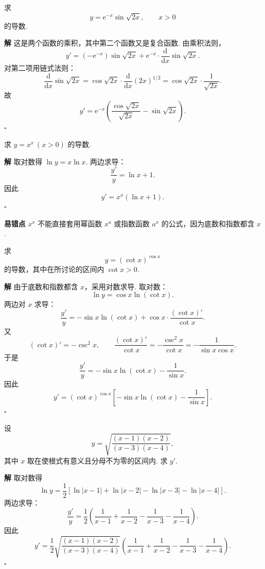 \documentclass[fontset=fandol]{ctexart}
\newenvironment{solution}{\par\noindent\textbf{解}\quad}{\hfill$\square$\par\vspace{0.8em}}
\newenvironment{warning}{\par\noindent\textbf{易错点}\quad}{\par\vspace{0.8em}}
\newcommand{\dd}{\mathrm{d}}
\newcommand{\ee}{\mathrm{e}}
\begin{document}
\begin{example}[复合与乘积同时出现]
求
\[
y=\ee^{-x}\sin\sqrt{2x},\qquad x>0
\]
的导数.
\end{example}
\begin{solution}
这是两个函数的乘积，其中第二个函数又是复合函数. 由乘积法则，
\[
y'=(-\ee^{-x})\sin\sqrt{2x}
+\ee^{-x}\cdot\frac{\dd}{\dd x}\sin\sqrt{2x}.
\]
对第二项用链式法则：
\[
\frac{\dd}{\dd x}\sin\sqrt{2x}
=\cos\sqrt{2x}\cdot\frac{\dd}{\dd x}(2x)^{1/2}
=\cos\sqrt{2x}\cdot\frac1{\sqrt{2x}}.
\]
故
\[
y'=\ee^{-x}\left(\frac{\cos\sqrt{2x}}{\sqrt{2x}}-\sin\sqrt{2x}\right).
\]
\end{solution}

\begin{example}[对数求导]
求 $y=x^x\ (x>0)$ 的导数.
\end{example}
\begin{solution}
取对数得 $\ln y=x\ln x$. 两边求导：
\[
\frac{y'}{y}=\ln x+1.
\]
因此
\[
y'=x^x(\ln x+1).
\]
\end{solution}
\begin{warning}
$x^x$ 不能直接套用幂函数 $x^a$ 或指数函数 $a^x$ 的公式，因为底数和指数都含 $x$.
\end{warning}

\begin{example}[变底变指数函数]
求
\[
y=(\cot x)^{\cos x}
\]
的导数，其中在所讨论的区间内 $\cot x>0$.
\end{example}
\begin{solution}
由于底数和指数都含 $x$，采用对数求导. 取对数：
\[
\ln y=\cos x\ln(\cot x).
\]
两边对 $x$ 求导：
\[
\frac{y'}{y}
=-\sin x\ln(\cot x)+\cos x\cdot\frac{(\cot x)'}{\cot x}.
\]
又
\[
(\cot x)'=-\csc^2x,\qquad
\frac{(\cot x)'}{\cot x}
=-\frac{\csc^2x}{\cot x}
=-\frac{1}{\sin x\cos x}.
\]
于是
\[
\frac{y'}{y}
=-\sin x\ln(\cot x)-\frac1{\sin x}.
\]
因此
\[
y'=(\cot x)^{\cos x}\left[-\sin x\ln(\cot x)-\frac1{\sin x}\right].
\]
\end{solution}

\begin{example}[对数求导]
设
\[
y=\sqrt{\frac{(x-1)(x-2)}{(x-3)(x-4)}},
\]
其中 $x$ 取在使根式有意义且分母不为零的区间内. 求 $y'$.
\end{example}
\begin{solution}
取对数得
\[
\ln y=\frac12\left[\ln|x-1|+\ln|x-2|-\ln|x-3|-\ln|x-4|\right].
\]
两边求导：
\[
\frac{y'}{y}
=\frac12\left(\frac1{x-1}+\frac1{x-2}-\frac1{x-3}-\frac1{x-4}\right).
\]
因此
\[
y'=\frac12\sqrt{\frac{(x-1)(x-2)}{(x-3)(x-4)}}
\left(\frac1{x-1}+\frac1{x-2}-\frac1{x-3}-\frac1{x-4}\right).
\]
\end{solution}
\end{document}
